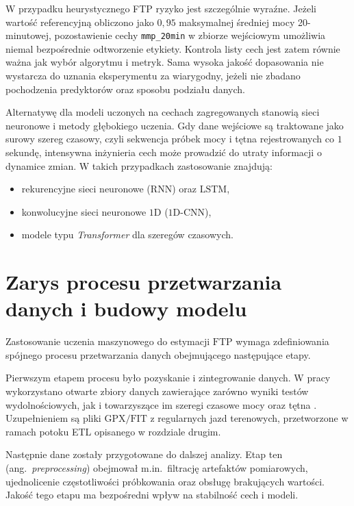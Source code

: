 W przypadku heurystycznego FTP ryzyko jest szczególnie wyraźne. Jeżeli wartość referencyjną obliczono jako $0{,}95$ maksymalnej średniej mocy 20-minutowej, pozostawienie cechy \texttt{mmp\_20min} w zbiorze wejściowym umożliwia niemal bezpośrednie odtworzenie etykiety. Kontrola listy cech jest zatem równie ważna jak wybór algorytmu i metryk. Sama wysoka jakość dopasowania nie wystarcza do uznania eksperymentu za wiarygodny, jeżeli nie zbadano pochodzenia predyktorów oraz sposobu podziału danych.

Alternatywę dla modeli uczonych na cechach zagregowanych stanowią sieci neuronowe i metody głębokiego uczenia.
Gdy dane wejściowe są traktowane jako surowy szereg czasowy, czyli sekwencja próbek mocy i tętna rejestrowanych co $1$ sekundę, intensywna inżynieria cech może prowadzić do utraty informacji o dynamice zmian.
W takich przypadkach zastosowanie znajdują:
\begin{itemize}
  \item rekurencyjne sieci neuronowe ($\mathrm{RNN}$) oraz $\mathrm{LSTM}$,
  \item konwolucyjne sieci neuronowe $1\mathrm{D}$ ($1\mathrm{D}$-$\mathrm{CNN}$),
  \item modele typu \textit{Transformer} dla szeregów czasowych.
\end{itemize}

\section{Zarys procesu przetwarzania danych i budowy modelu}

Zastosowanie uczenia maszynowego do estymacji $\mathrm{FTP}$ wymaga zdefiniowania spójnego procesu przetwarzania danych obejmującego następujące etapy.

Pierwszym etapem procesu było pozyskanie i zintegrowanie danych.
W pracy wykorzystano otwarte zbiory danych zawierające zarówno wyniki testów wydolnościowych, jak i towarzyszące im szeregi czasowe mocy oraz tętna \parencite{kaggle_redlineracer_road_cycling_performance_testing,osf_goldencheetah_opendata,stockwell2023mlftp}.
Uzupełnieniem są pliki $\mathrm{GPX}/\mathrm{FIT}$ z regularnych jazd terenowych, przetworzone w ramach potoku ETL opisanego w rozdziale drugim.

Następnie dane zostały przygotowane do dalszej analizy.
Etap ten (ang.\ \textit{preprocessing}) obejmował m.in.\ filtrację artefaktów pomiarowych, ujednolicenie częstotliwości próbkowania oraz obsługę brakujących wartości.
Jakość tego etapu ma bezpośredni wpływ na stabilność cech i modeli.

